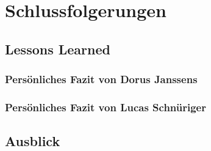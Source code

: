 \section{Schlussfolgerungen}

\subsection{Lessons Learned}

\subsubsection{Persönliches Fazit von Dorus Janssens}

\subsubsection{Persönliches Fazit von Lucas Schnüriger}


\subsection{Ausblick}

